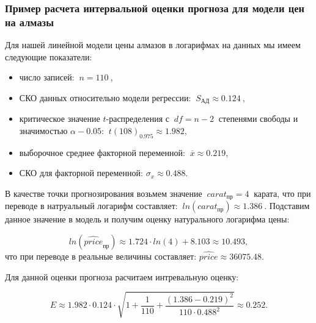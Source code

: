 \documentclass[
]{article}
\providecommand{\tightlist}{%
  \setlength{\itemsep}{0pt}\setlength{\parskip}{0pt}}
\begin{document}
\hypertarget{ux43fux440ux438ux43cux435ux440-ux440ux430ux441ux447ux435ux442ux430-ux438ux43dux442ux435ux440ux432ux430ux43bux44cux43dux43eux439-ux43eux446ux435ux43dux43aux438-ux43fux440ux43eux433ux43dux43eux437ux430-ux434ux43bux44f-ux43cux43eux434ux435ux43bux438-ux446ux435ux43d-ux43dux430-ux430ux43bux43cux430ux437ux44b}{%
\subsubsection{\texorpdfstring{\textbf{Пример расчета интервальной
оценки прогноза для модели цен на
алмазы}}{Пример расчета интервальной оценки прогноза для модели цен на алмазы}}\label{ux43fux440ux438ux43cux435ux440-ux440ux430ux441ux447ux435ux442ux430-ux438ux43dux442ux435ux440ux432ux430ux43bux44cux43dux43eux439-ux43eux446ux435ux43dux43aux438-ux43fux440ux43eux433ux43dux43eux437ux430-ux434ux43bux44f-ux43cux43eux434ux435ux43bux438-ux446ux435ux43d-ux43dux430-ux430ux43bux43cux430ux437ux44b}}

Для нашей линейной модели цены алмазов в логарифмах на данных мы имеем
следующие показатели:

\begin{itemize}
\tightlist
\item
  число записей: \(\ n = 110\ \),
\item
  СКО данных относительно модели регрессии:
  \(\ S_{\text{АД}} \approx 0.124\ \),
\item
  критическое значение \(t\)-распределения с \(\ df = n-2\ \) степенями
  свободы и значимостью \(\alpha - 0.05\):
  \(\ t(108)_{0.975} \approx 1.982\),
\item
  выборочное среднее факторной переменной:
  \(\ \overline{x} \approx 0.219\),
\item
  СКО для факторной переменной: \(\sigma_x \approx 0.488\).
\end{itemize}

В качестве точки прогнозирования возьмем значение \(\ carat_{пр} = 4\ \)
карата, что при переводе в натруальный логарифм составляет:
\(\ ln(carat_{пр}) \approx 1.386\ \). Подставим данное значение в модель
и получим оценку натурального логарифма цены:

\[
ln(\hat{price}_{пр}) \approx 1.724 \cdot ln(4) + 8.103 \approx 10.493,
\] что при переводе в реальные величины составляет:
\(\hat{price} \approx 36075.48\).

Для данной оценки прогноза расчитаем интревальную оценку:

\[
E \approx 1.982 \cdot 0.124 \cdot \sqrt{1 + \frac{1}{110} + \frac{\left(1.386 - 0.219\right)^2}{110 \cdot 0.488^2}} \approx 0.252.
\]
\end{document}
